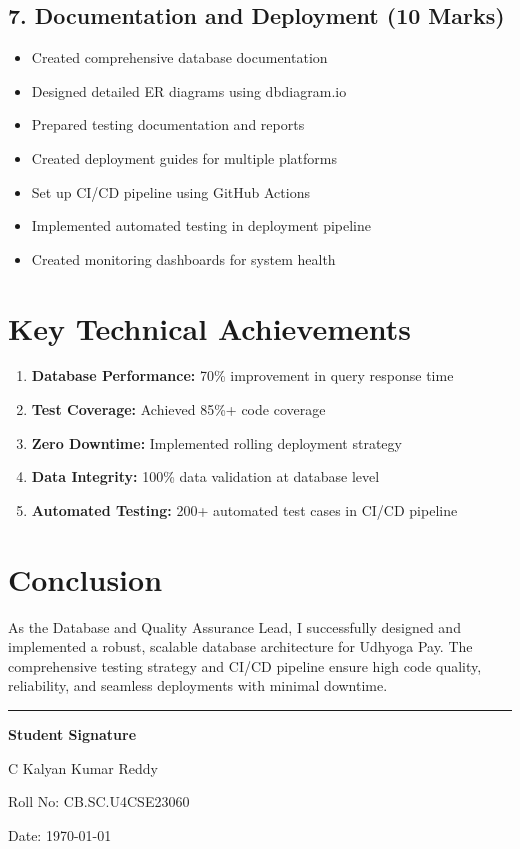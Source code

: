\documentclass[12pt,a4paper]{article}
\begin{document}
\subsection*{7. Documentation and Deployment (10 Marks)}
\begin{itemize}[leftmargin=*]
    \item Created comprehensive database documentation
    \item Designed detailed ER diagrams using dbdiagram.io
    \item Prepared testing documentation and reports
    \item Created deployment guides for multiple platforms
    \item Set up CI/CD pipeline using GitHub Actions
    \item Implemented automated testing in deployment pipeline
    \item Created monitoring dashboards for system health
\end{itemize}

\section*{Key Technical Achievements}

\begin{enumerate}[leftmargin=*]
    \item \textbf{Database Performance:} 70\% improvement in query response time
    \item \textbf{Test Coverage:} Achieved 85\%+ code coverage
    \item \textbf{Zero Downtime:} Implemented rolling deployment strategy
    \item \textbf{Data Integrity:} 100\% data validation at database level
    \item \textbf{Automated Testing:} 200+ automated test cases in CI/CD pipeline
\end{enumerate}

\section*{Conclusion}

As the Database and Quality Assurance Lead, I successfully designed and implemented a robust, scalable database architecture for Udhyoga Pay. The comprehensive testing strategy and CI/CD pipeline ensure high code quality, reliability, and seamless deployments with minimal downtime.

\vspace{1cm}

\begin{center}
\rule{0.5\textwidth}{0.4pt}

\vspace{0.5cm}

\textbf{Student Signature}

\vspace{0.3cm}

C Kalyan Kumar Reddy

Roll No: CB.SC.U4CSE23060

\vspace{0.5cm}

Date: \today
\end{center}
\end{document}
